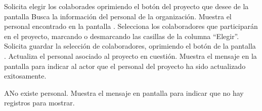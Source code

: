  \begin{UCtrayectoria}
    \UCpaso[\UCactor] Solicita elegir los colaborades oprimiendo el botón \btnColaboradores del proyecto que desee de la pantalla 
    \UCpaso[\UCsist] Busca la información del personal de la organización. 
    \UCpaso[\UCsist] Muestra el personal encontrado en la pantalla .
	\UCpaso[\UCactor] Selecciona los colaboradores que participarán en el proyecto, marcando o desmarcando las casillas de la columna ``Elegir''.
    \UCpaso[\UCactor] Solicita guardar la selección de colaboradores, oprimiendo el botón  de la pantalla .
	\UCpaso[\UCsist] Actualiza el personal asociado al proyecto en cuestión.
    \UCpaso[\UCsist] Muestra el mensaje  en la pantalla 
    para indicar al actor que el personal del proyecto ha sido actualizado exitosamente.
 \end{UCtrayectoria}
 
 \begin{UCtrayectoriaA}{A}{No existe personal.}
    \UCpaso[\UCsist] Muestra el mensaje  en pantalla  
    para indicar que no hay registros para mostrar.
 \end{UCtrayectoriaA}
 
